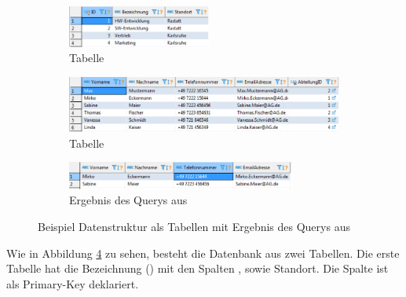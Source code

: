 \begin{figure}[ht]
  \centering
  \begin{subfigure}[h]{\textwidth}
    \centering
    \includegraphics[width=0.517045455\textwidth]{content/hauptteil/theoretischeGrundlagen/rec/exampleSQLAbteilung.pdf}
    \caption{Tabelle }
    \label{fig:exampleSQLStructure:abteilung}
    \hspace{50.00mm}
  \end{subfigure}
  \begin{subfigure}[h]{\textwidth}
      \centering
      \includegraphics[width=\textwidth]{content/hauptteil/theoretischeGrundlagen/rec/exampleSQLMitarbeiterdaten.pdf}
      \caption{Tabelle }
      \label{fig:exampleSQLStructure:mitarbeiter}
      \hspace{50.00mm}
  \end{subfigure}
  \begin{subfigure}[h]{\textwidth}
      \centering
      \includegraphics[width=0.825284091\textwidth]{content/hauptteil/theoretischeGrundlagen/rec/exampleSQLErgebnis.pdf}
      \caption{Ergebnis des Querys aus }
      \label{fig:exampleSQLStructure:result}
  \end{subfigure}
  \caption[Beispiel Datenstruktur mit Ergebnis von einem  Query]{Beispiel Datenstruktur als Tabellen mit Ergebnis des Querys aus }
  \label{fig:exampleSQLStructure}
\end{figure}
Wie in Abbildung \ref{fig:exampleSQLStructure} zu sehen, besteht die Datenbank  aus zwei Tabellen.
Die erste Tabelle hat die Bezeichnung () mit den Spalten ,  sowie Standort.
Die Spalte  ist als Primary-Key deklariert.
